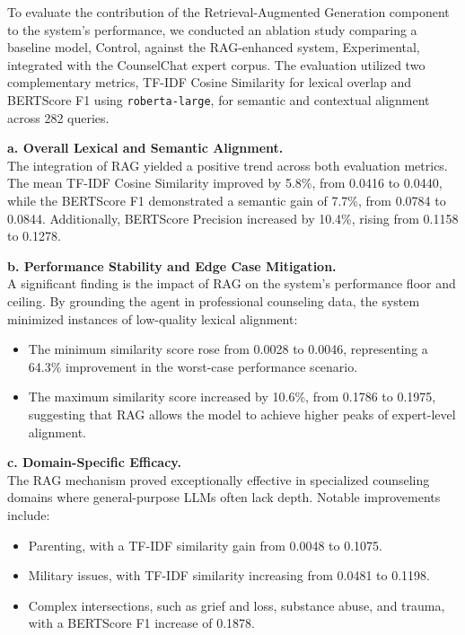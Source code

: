 To evaluate the contribution of the Retrieval-Augmented Generation component to the system's performance, we conducted an ablation study comparing a baseline model, Control, against the RAG-enhanced system, Experimental, integrated with the CounselChat expert corpus. The evaluation utilized two complementary metrics, TF-IDF Cosine Similarity for lexical overlap and BERTScore F1 using \texttt{roberta-large}, for semantic and contextual alignment across 282 queries.

\textbf{a. Overall Lexical and Semantic Alignment.}\\
The integration of RAG yielded a positive trend across both evaluation metrics. The mean TF-IDF Cosine Similarity improved by 5.8\%, from 0.0416 to 0.0440, while the BERTScore F1 demonstrated a semantic gain of 7.7\%, from 0.0784 to 0.0844. Additionally, BERTScore Precision increased by 10.4\%, rising from 0.1158 to 0.1278.

\textbf{b. Performance Stability and Edge Case Mitigation.}\\
A significant finding is the impact of RAG on the system's performance floor and ceiling. By grounding the agent in professional counseling data, the system minimized instances of low-quality lexical alignment:
\begin{itemize}
    \item The minimum similarity score rose from 0.0028 to 0.0046, representing a 64.3\% improvement in the worst-case performance scenario.
    \item The maximum similarity score increased by 10.6\%, from 0.1786 to 0.1975, suggesting that RAG allows the model to achieve higher peaks of expert-level alignment.
\end{itemize}

\textbf{c. Domain-Specific Efficacy.}\\
The RAG mechanism proved exceptionally effective in specialized counseling domains where general-purpose LLMs often lack depth. Notable improvements include:
\begin{itemize}
    \item Parenting, with a TF-IDF similarity gain from 0.0048 to 0.1075.
    \item Military issues, with TF-IDF similarity increasing from 0.0481 to 0.1198.
    \item Complex intersections, such as grief and loss, substance abuse, and trauma, with a BERTScore F1 increase of 0.1878.
\end{itemize}
